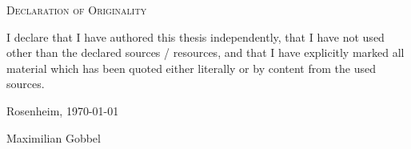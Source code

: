 {
\large
\thispagestyle{empty}
\vspace*{\fill}

\noindent
\textsc{Declaration of Originality}

\medskip

\noindent
I declare that I have authored this thesis independently, that I have not used other than the declared sources / resources, and that I have explicitly marked all material which has been quoted either literally or by content from the used sources.

\bigskip

\noindent
Rosenheim, \today

\vspace*{2cm}

\noindent
Maximilian Gobbel
}

